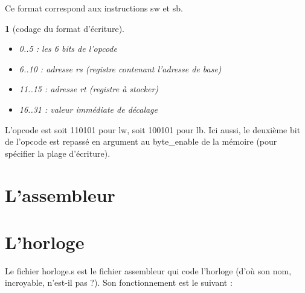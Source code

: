 \documentclass[13pt]{article}
\newtheorem{format}{  }
\begin{document}
Ce format correspond aux instructions sw et sb.

\begin{format}[codage du format d'écriture]
  \begin{itemize}
  \item 0..5 : les 6 bits de l'opcode
  \item 6..10 : adresse rs (registre contenant l'adresse de base) 
  \item 11..15 : adresse rt (registre à stocker)
  \item 16..31 : valeur immédiate de décalage
  \end{itemize}
\end{format}

L'opcode est soit 110101 pour lw, soit 100101 pour lb. Ici aussi, 
le deuxième bit de l'opcode est repassé en argument au byte\_enable
de la mémoire (pour spécifier la plage d'écriture).


\section{L'assembleur}

\section{L'horloge}

Le fichier horloge.s est le fichier assembleur qui code l'horloge (d'où son nom,
incroyable, n'est-il pas ?). Son fonctionnement est le suivant :
\end{document}
